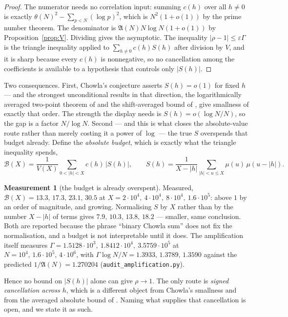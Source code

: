 \documentclass[11pt,a4paper]{article}
\theoremstyle{plain}
\theoremstyle{definition}
\newtheorem{measurement}[theorem]{Measurement}
\theoremstyle{remark}
\newcommand{\AAA}{\mathfrak{A}}
\begin{document}
\begin{proof}
The numerator needs no correlation input: summing $c(h)$ over all
$h\ne0$ is exactly $\theta(N)^2-\sum_{p<N}(\log p)^2$, which is
$N^2(1+o(1))$ by the prime number theorem. The denominator is
$\AAA(N)N\log N(1+o(1))$ by Proposition~\ref{prop:V}. Dividing gives
the asymptotic. The inequality $|\rho-1|\le\varepsilon\Gamma$ is the
triangle inequality applied to $\sum_{h\ne0}c(h)S(h)$ after division
by $V$, and it is sharp because every $c(h)$ is nonnegative, so no
cancellation among the coefficients is available to a hypothesis that
controls only $|S(h)|$.
\end{proof}

Two consequences. First, Chowla's conjecture asserts $S(h)=o(1)$ for
fixed $h$ --- and the strongest unconditional results in that
direction, the logarithmically averaged two-point theorem of
\cite{Tao16} and the shift-averaged bound of \cite{MRT15}, give
smallness of exactly that order. The strength the display needs is
$S(h)=o(\log N/N)$, so the gap is a factor $N/\log N$. Second --- and this is what closes the
absolute-value route rather than merely costing it a power of $\log$
--- the true $S$ overspends that budget already. Define the
\emph{absolute budget}, which is exactly what the triangle inequality
spends,
\begin{equation}\label{eq:budget}
  \mathcal B(X)=\frac{1}{V(X)}\sum_{0<|h|<X}c(h)\,\bigl|S(h)\bigr|,
  \qquad
  S(h)=\frac{1}{X-|h|}\!\!\sum_{|h|<u\le X}\!\!\mu(u)\,\mu(u-|h|).
\end{equation}

\begin{measurement}[the budget is already overspent]\label{meas:budget}
Measured, $\mathcal B(X)=13.3,\,17.3,\,23.1,\,30.5$ at
$X=2\cdot10^4,\ 4\cdot10^4,\ 8\cdot10^4,\ 1.6\cdot10^5$: above $1$ by
an order of magnitude, and growing. Normalising $S$ by $X$ rather than
by the number $X-|h|$ of terms gives $7.9,\,10.3,\,13.8,\,18.2$ ---
smaller, same conclusion. Both are reported because the phrase
``binary Chowla sum'' does not fix the normalisation, and a budget is
not interpretable until it does. The amplification itself measures
$\Gamma=1.5128\cdot10^{3},\ 1.8412\cdot10^{4},\ 3.5759\cdot10^{5}$ at
$N=10^4,\,1.6\cdot10^5,\,4\cdot10^6$, with
$\Gamma\log N/N=1.3933,\,1.3789,\,1.3590$ against the predicted
$1/\AAA(N)=1.270204$
(\texttt{audit\_amplification.py}).
\end{measurement}

Hence no bound on $|S(h)|$ alone can give $\rho\to1$. The only route
is \emph{signed cancellation across $h$}, which is a different object
from Chowla's smallness and from the averaged absolute bound of
\cite{MRT15}. Naming what supplies that cancellation is open, and we
state it as such.
\end{document}
